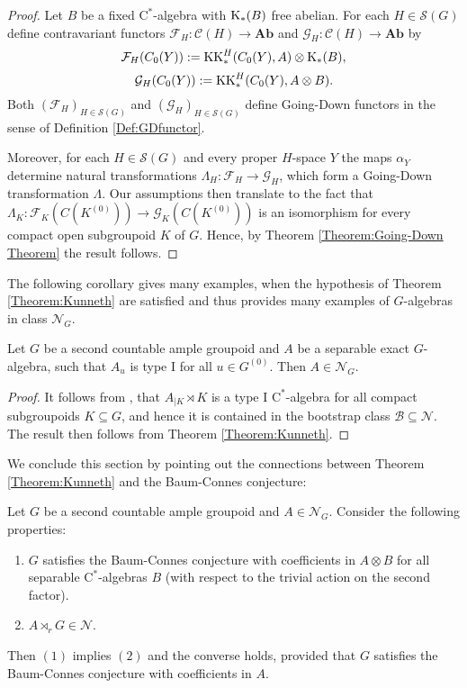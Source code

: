 	\begin{proof}
		Let $B$ be a fixed $\mathrm{C}^*$-algebra with $\mathrm K_*(B)$ free abelian. For each $H\in \mathcal{S}(G)$ define contravariant functors
		$\mathcal{F}_H:\mathcal{C}(H)\rightarrow\mathbf{Ab}$ and $\mathcal{G}_H:\mathcal{C}(H)\rightarrow\mathbf{Ab}$ by
		$$\mathcal{F}_H(C_0(Y)):=\mathrm{KK}^H_*(C_0(Y),A)\otimes \mathrm K_*(B),$$
		$$\mathcal{G}_H(C_0(Y)):=\mathrm{KK}^H_*(C_0(Y),A\otimes B).$$
		Both $(\mathcal{F}_H)_{H\in\mathcal{S}(G)}$ and $(\mathcal{G}_H)_{H\in\mathcal{S}(G)}$ define Going-Down functors in the sense of Definition \ref{Def:GDfunctor}.
		
		Moreover, for each $H\in \mathcal{S}(G)$ and every proper $H$-space $Y$ the maps $\alpha_Y$ determine natural transformations $\Lambda_H:\mathcal{F}_H\rightarrow\mathcal{G}_H$, which form a Going-Down transformation $\Lambda$.
		Our assumptions then translate to the fact that $\Lambda_K:\mathcal{F}_K(C(K^{(0)}))\rightarrow \mathcal{G}_K(C(K^{(0)}))$ is an isomorphism for every compact open subgroupoid $K$ of $G$. Hence, by Theorem \ref{Theorem:Going-Down Theorem} the result follows.
	\end{proof}
	The following corollary gives many examples, when the hypothesis of Theorem \ref{Theorem:Kunneth} are satisfied and thus provides many examples of $G$-algebras in class $\mathcal{N}_G$.
	\begin{kor}\label{Cor:Kunneth}
		Let $G$ be a second countable ample groupoid and $A$ be a separable exact $G$-algebra, such that $A_u$ is type I for all $u\in G^{(0)}$. Then $A\in\mathcal{N}_G$.
	\end{kor}
	\begin{proof}
		It follows from \cite[Proposition~10.3]{Tu98}, that $A_{\mid K}\rtimes K$ is a type I $\mathrm{C}^*$-algebra for all compact subgroupoids $K\subseteq G$, and hence it is contained in the bootstrap class $\mathcal{B}\subseteq \mathcal{N}$. The result then follows from Theorem \ref{Theorem:Kunneth}.
	\end{proof}
	We conclude this section by pointing out the connections between Theorem \ref{Theorem:Kunneth} and the Baum-Connes conjecture:
	\begin{prop}\label{Prop:BCandKunneth}
		Let $G$ be a second countable ample groupoid and $A\in\mathcal{N}_G$. Consider the following properties:
		\begin{enumerate}
			\item $G$ satisfies the Baum-Connes conjecture with coefficients in $A\otimes B$ for all separable $\mathrm{C}^*$-algebras $B$ (with respect to the trivial action on the second factor).
			\item $A\rtimes_r G\in\mathcal{N}$.
		\end{enumerate}
		Then $(1)$ implies $(2)$ and the converse holds, provided that $G$ satisfies the Baum-Connes conjecture with coefficients in $A$.
	\end{prop}
